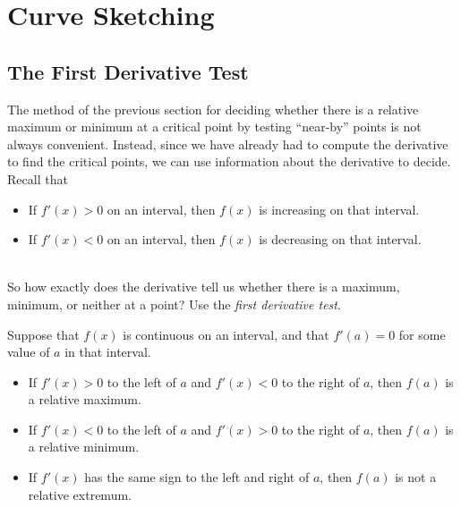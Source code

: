 \chapter{Curve Sketching}

\section{The First Derivative Test}

The method of the previous section for deciding whether there is a
relative maximum or minimum at a critical point by testing ``near-by''
points is not always convenient. Instead, since we have already had to
compute the derivative to find the critical points, we can use
information about the derivative to decide. \cite{mooc} Recall that
~\\
\begin{itemize}
\item If $f'(x) >0$ on an interval, then $f(x)$ is increasing on that interval.
\item If $f'(x) <0$ on an interval, then $f(x)$ is decreasing on that interval.
\end{itemize}
~\\
So how exactly does the derivative tell us whether there is a maximum,
minimum, or neither at a point? Use the \textit{first derivative test}. \cite{mooc}

\begin{theorem}
    \label{T:fdt}\hfil
    Suppose that $f(x)$ is continuous on an interval, and that $f'(a)=0$
    for some value of $a$ in that interval.
    \begin{itemize}
        \item If $f'(x)>0$ to the left of $a$ and $f'(x)<0$ to the right of
        $a$, then $f(a)$ is a relative maximum.
        \item If $f'(x)<0$ to the left of $a$ and $f'(x)>0$ to the right of
        $a$, then $f(a)$ is a relative minimum.
        \item If $f'(x)$ has the same sign to the left and right of $a$,
        then $f(a)$ is not a relative extremum.
    \end{itemize}
    \cite{mooc}
\end{theorem}

